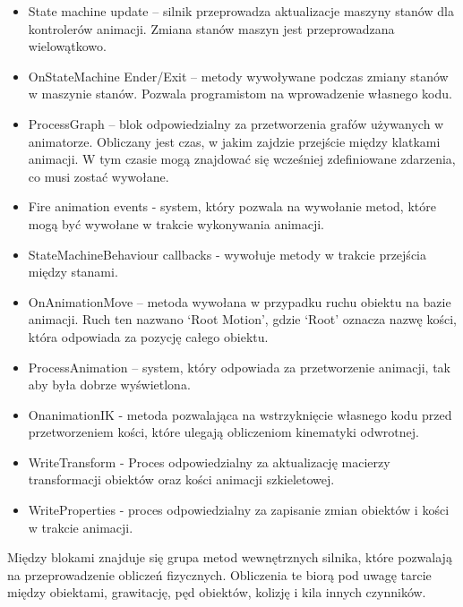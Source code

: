 \documentclass[12pt,twoside]{article}
\begin{document}
\begin{itemize}
\item State machine update – silnik przeprowadza aktualizacje maszyny stanów dla
kontrolerów animacji. Zmiana stanów maszyn jest przeprowadzana wielowątkowo. 
\item OnStateMachine Ender/Exit – metody wywoływane podczas zmiany stanów w
maszynie stanów. Pozwala programistom na wprowadzenie własnego kodu.
\item ProcessGraph – blok odpowiedzialny za przetworzenia grafów używanych w
animatorze. Obliczany jest czas, w jakim zajdzie przejście między klatkami
animacji. W tym czasie mogą znajdować się wcześniej zdefiniowane zdarzenia, co
musi zostać wywołane. 
\item Fire animation events - system, który pozwala na wywołanie metod, które
mogą być wywołane w trakcie wykonywania animacji. 
\item StateMachineBehaviour callbacks - wywołuje metody w trakcie
przejścia między stanami. 
\item OnAnimationMove – metoda wywołana w przypadku ruchu obiektu na bazie
animacji. Ruch ten nazwano ‘Root Motion’, gdzie ‘Root’ oznacza nazwę kości,
która odpowiada za pozycję całego obiektu.  
\item ProcessAnimation – system, który odpowiada za przetworzenie animacji, tak
aby była dobrze wyświetlona.  
\item OnanimationIK - metoda pozwalająca na wstrzyknięcie własnego kodu przed
przetworzeniem kości, które ulegają obliczeniom kinematyki odwrotnej.   
\item WriteTransform - Proces odpowiedzialny za aktualizację macierzy
transformacji obiektów oraz kości animacji szkieletowej. 
\item WriteProperties - proces odpowiedzialny za zapisanie zmian obiektów i kości w trakcie animacji.  
\end{itemize}
Między blokami znajduje się grupa metod wewnętrznych silnika, które pozwalają na
przeprowadzenie obliczeń fizycznych. Obliczenia te biorą pod uwagę tarcie między
obiektami, grawitację, pęd obiektów, kolizję i kila innych czynników.   
\end{document}
